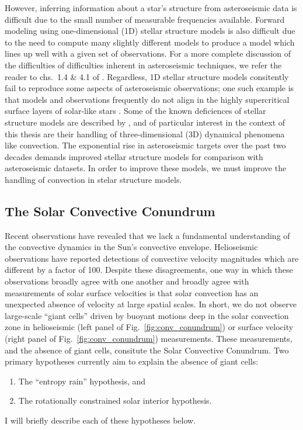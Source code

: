 However, inferring information about a star's structure from asteroseismic data is difficult due to the small number of measurable frequencies available.
Forward modeling using one-dimensional (1D) stellar structure models is also difficult due to the need to compute many slightly different models to produce a model which lines up well with a given set of observations.
For a more complete discussion of the difficulties of difficulties inherent in asteroseismic techniques, we refer the reader to chs.~1.4 \& 4.1 of \citet{bellingerT2018}.
Regardless, 1D stellar structure models consitently fail to reproduce some aspects of asteroseismic observations; one such example is that models and observations frequently do not align in the highly supercritical surface layers of solar-like stars \citep[as discussed in][]{jorgensen&weiss2019}.
Some of the known deficiences of stellar structure models are described by \cite{buldgen2019}, and of particular interest in the context of this thesis are their handling of three-dimensional (3D) dynamical phenomena like convection.
The exponential rise in asteroseismic targets over the past two decades demands improved stellar structure models for comparison with asteroseismic datasets.
In order to improve these models, we must improve the handling of convection in stelar structure models. 



\subsection{The Solar Convective Conundrum}
\label{sct:convective_conundrum}
Recent observations have revealed that we lack a fundamental understanding of the convective dynamics in the Sun's convective envelope.
Helioseismic observations \citep{hanasoge&all2012, greer&all2015} have reported detections of convective velocity magnitudes which are different by a factor of 100.
Despite these disagreements, one way in which these observations broadly agree with one another and broadly agree with measurements of solar surface velocities \citep{hathaway&all2015} is that solar convection has an unexpected absence of velocity at large spatial scales.
In short, we do not observe large-scale ``giant cells'' driven by buoyant motions deep in the solar convection zone in helioseismic (left panel of Fig.~\ref{fig:conv_conundrum}) or surface velocity (right panel of Fig.~\ref{fig:conv_conundrum}) measurements.
These measurements, and the absence of giant cells, consitute the Solar Convective Conundrum.
Two primary hypotheses currently aim to explain the absence of giant cells: 
\begin{enumerate}
\item The ``entropy rain'' hypothesis, and
\item The rotationally constrained solar interior hypothesis.
\end{enumerate}
I will briefly describe each of these hypotheses below.

